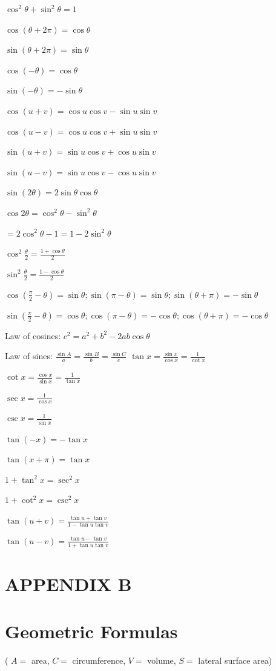 \documentclass[10pt]{article}
\begin{document}
$\cos ^{2} \theta+\sin ^{2} \theta=1$

$\cos (\theta+2 \pi)=\cos \theta$

$\sin (\theta+2 \pi)=\sin \theta$

$\cos (-\theta)=\cos \theta$

$\sin (-\theta)=-\sin \theta$

$\cos (u+v)=\cos u \cos v-\sin u \sin v$

$\cos (u-v)=\cos u \cos v+\sin u \sin v$

$\sin (u+v)=\sin u \cos v+\cos u \sin v$

$\sin (u-v)=\sin u \cos v-\cos u \sin v$

$\sin (2 \theta)=2 \sin \theta \cos \theta$

$\cos 2 \theta=\cos ^{2} \theta-\sin ^{2} \theta$

$=2 \cos ^{2} \theta-1=1-2 \sin ^{2} \theta$

$\cos ^{2} \frac{\theta}{2}=\frac{1+\cos \theta}{2}$

$\sin ^{2} \frac{\theta}{2}=\frac{1-\cos \theta}{2}$

$\cos \left(\frac{\pi}{2}-\theta\right)=\sin \theta ; \sin (\pi-\theta)=\sin \theta ; \sin (\theta+\pi)=-\sin \theta$

$\sin \left(\frac{\pi}{2}-\theta\right)=\cos \theta ; \cos (\pi-\theta)=-\cos \theta ; \cos (\theta+\pi)=-\cos \theta$

Law of cosines: $c^{2}=a^{2}+b^{2}-2 a b \cos \theta$

Law of sines: $\frac{\sin A}{a}=\frac{\sin B}{b}=\frac{\sin C}{c}$ $\tan x=\frac{\sin x}{\cos x}=\frac{1}{\cot x}$

$\cot x=\frac{\cos x}{\sin x}=\frac{1}{\tan x}$

$\sec x=\frac{1}{\cos x}$

$\csc x=\frac{1}{\sin x}$

$\tan (-x)=-\tan x$

$\tan (x+\pi)=\tan x$

$1+\tan ^{2} x=\sec ^{2} x$

$1+\cot ^{2} x=\csc ^{2} x$

$\tan (u+v)=\frac{\tan u+\tan v}{1-\tan u \tan v}$

$\tan (u-v)=\frac{\tan u-\tan v}{1+\tan u \tan v}$

\section*{APPENDIX B}
\section*{Geometric Formulas}
( $A=$ area, $C=$ circumference, $V=$ volume, $S=$ lateral surface area)
\end{document}

